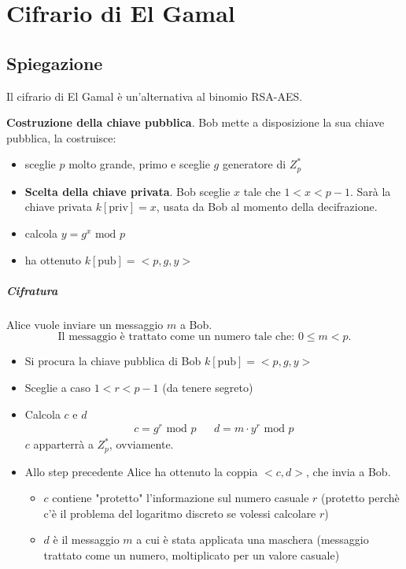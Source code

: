 \chapter{Cifrario di El Gamal}
\section{Spiegazione}
Il cifrario di El Gamal è un'alternativa al binomio RSA-AES.
\begin{framed}\noindent \textbf{Costruzione della chiave pubblica}. Bob mette a disposizione la sua chiave pubblica, la costruisce:
	\begin{itemize}
		\item sceglie $p$ molto grande, primo e sceglie $g$ generatore di $Z_p^*$
		\item \textbf{Scelta della chiave privata}. Bob sceglie $x$ tale che $1 < x < p-1$. Sarà la chiave privata $k[\text{priv}]=x$, usata da Bob al momento della decifrazione.
		\item calcola $y = g^x \text{ mod } p$
		\item ha ottenuto $k[\text{pub}]=<p, g, y>$
	\end{itemize}
\end{framed}
\paragraph{Cifratura} Alice vuole inviare un messaggio $m$ a Bob.
\[\boxed{\text{Il messaggio è trattato come un numero tale che: $0 \leq m < p$.}}\]
\begin{itemize}
    \item Si procura la chiave pubblica di Bob $k[\text{pub}]=<p, g, y>$ 
    
    \item Sceglie a caso $1 < r < p-1$ (da tenere segreto)
    \item Calcola $c$ e $d$
    \begin{align*}
    	c = g^r \text{ mod } p&&d = m \cdot y^r \text{ mod } p
    \end{align*}
	$c$ apparterrà a $Z_p^*$, ovviamente. 
    \item Allo step precedente Alice ha  ottenuto la coppia $<c,d>$, che invia a Bob. \begin{itemize}
    	\item $c$ contiene "protetto" l'informazione sul numero casuale $r$ (protetto perchè c'è il problema del logaritmo discreto se volessi calcolare $r$)
    	\item $d$ è il messaggio $m$ a cui è stata applicata una maschera (messaggio trattato come un numero, moltiplicato per un valore casuale)
\end{itemize}\end{itemize}

